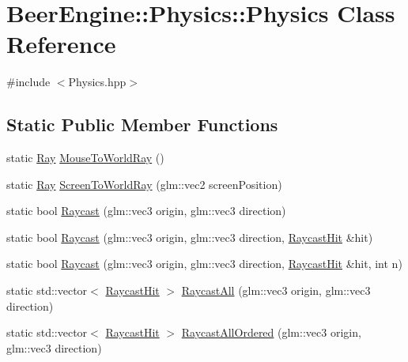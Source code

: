 \hypertarget{class_beer_engine_1_1_physics_1_1_physics}{}\section{Beer\+Engine\+:\+:Physics\+:\+:Physics Class Reference}
\label{class_beer_engine_1_1_physics_1_1_physics}


{\ttfamily \#include $<$Physics.\+hpp$>$}

\subsection*{Static Public Member Functions}
\begin{DoxyCompactItemize}
\item 
static \mbox{\hyperlink{struct_beer_engine_1_1_physics_1_1_ray}{Ray}} \mbox{\hyperlink{class_beer_engine_1_1_physics_1_1_physics_af462e9508d245e1477b468f947af9a82}{Mouse\+To\+World\+Ray}} ()
\item 
static \mbox{\hyperlink{struct_beer_engine_1_1_physics_1_1_ray}{Ray}} \mbox{\hyperlink{class_beer_engine_1_1_physics_1_1_physics_ac345bcbfc2b0a5d7dd3b5d7fb6694825}{Screen\+To\+World\+Ray}} (glm\+::vec2 screen\+Position)
\item 
static bool \mbox{\hyperlink{class_beer_engine_1_1_physics_1_1_physics_a75ad2de8af72e4e5309c5c47bdfd6a02}{Raycast}} (glm\+::vec3 origin, glm\+::vec3 direction)
\item 
static bool \mbox{\hyperlink{class_beer_engine_1_1_physics_1_1_physics_a427c654b718bb4948648d55a80934c33}{Raycast}} (glm\+::vec3 origin, glm\+::vec3 direction, \mbox{\hyperlink{struct_beer_engine_1_1_physics_1_1_raycast_hit}{Raycast\+Hit}} \&hit)
\item 
static bool \mbox{\hyperlink{class_beer_engine_1_1_physics_1_1_physics_a2ab720f864bdb8c90ae46626c06cead9}{Raycast}} (glm\+::vec3 origin, glm\+::vec3 direction, \mbox{\hyperlink{struct_beer_engine_1_1_physics_1_1_raycast_hit}{Raycast\+Hit}} \&hit, int n)
\item 
static std\+::vector$<$ \mbox{\hyperlink{struct_beer_engine_1_1_physics_1_1_raycast_hit}{Raycast\+Hit}} $>$ \mbox{\hyperlink{class_beer_engine_1_1_physics_1_1_physics_a8cb427e1ed3ee30ba6abc91b4b303322}{Raycast\+All}} (glm\+::vec3 origin, glm\+::vec3 direction)
\item 
static std\+::vector$<$ \mbox{\hyperlink{struct_beer_engine_1_1_physics_1_1_raycast_hit}{Raycast\+Hit}} $>$ \mbox{\hyperlink{class_beer_engine_1_1_physics_1_1_physics_a8dd767807735fc5cfb4a321e45adaec5}{Raycast\+All\+Ordered}} (glm\+::vec3 origin, glm\+::vec3 direction)
\end{DoxyCompactItemize}


